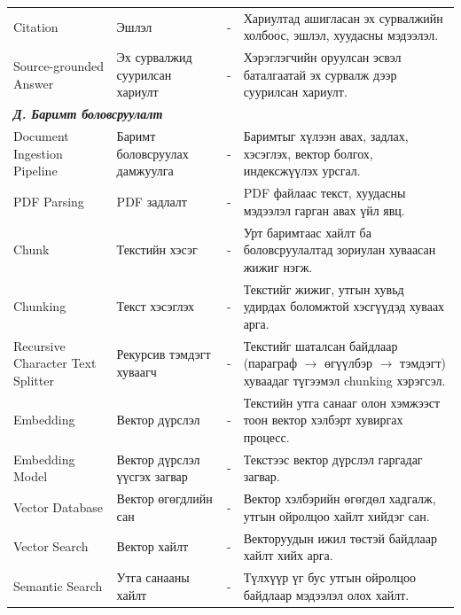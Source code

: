 {\begin{longtable}{p{} p{} p{} p{}}
Citation & Эшлэл & - & Хариултад ашигласан эх сурвалжийн холбоос, эшлэл, хуудасны мэдээлэл. \\

Source-grounded Answer & Эх сурвалжид суурилсан хариулт & - & Хэрэглэгчийн оруулсан эсвэл баталгаатай эх сурвалж дээр суурилсан хариулт. \\

\midrule
\multicolumn{4}{l}{\textbf{\textit{Д. Баримт боловсруулалт}}} \\
\midrule

Document Ingestion Pipeline & Баримт боловсруулах дамжуулга & - & Баримтыг хүлээн авах, задлах, хэсэглэх, вектор болгох, индексжүүлэх урсгал. \\

PDF Parsing & PDF задлалт & - & PDF файлаас текст, хуудасны мэдээлэл гарган авах үйл явц. \\

Chunk & Текстийн хэсэг & - & Урт баримтаас хайлт ба боловсруулалтад зориулан хуваасан жижиг нэгж. \\

Chunking & Текст хэсэглэх & - & Текстийг жижиг, утгын хувьд удирдах боломжтой хэсгүүдэд хуваах арга. \\

Recursive Character Text Splitter & Рекурсив тэмдэгт хуваагч & - & Текстийг шаталсан байдлаар (параграф $\rightarrow$ өгүүлбэр $\rightarrow$ тэмдэгт) хуваадаг түгээмэл chunking хэрэгсэл. \\

Embedding & Вектор дүрслэл & - & Текстийн утга санааг олон хэмжээст тоон вектор хэлбэрт хувиргах процесс. \\

Embedding Model & Вектор дүрслэл үүсгэх загвар & - & Текстээс вектор дүрслэл гаргадаг загвар. \\

Vector Database & Вектор өгөгдлийн сан & - & Вектор хэлбэрийн өгөгдөл хадгалж, утгын ойролцоо хайлт хийдэг сан. \\

Vector Search & Вектор хайлт & - & Векторуудын ижил төстэй байдлаар хайлт хийх арга. \\

Semantic Search & Утга санааны хайлт & - & Түлхүүр үг бус утгын ойролцоо байдлаар мэдээлэл олох хайлт. \\


\end{longtable}}
